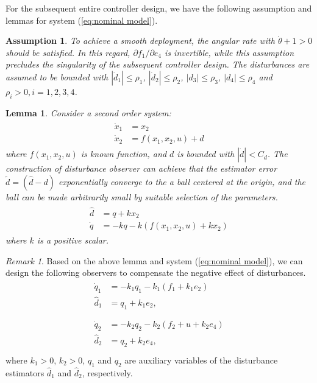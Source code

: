 \documentclass[ShortAfour]{sage}
\theoremstyle{plain}
\newtheorem{myas}{Assumption}
\newtheorem{mylem}{Lemma}
\theoremstyle{remark}
\newtheorem{myrem}{Remark}
\begin{document}
For the subsequent entire controller design, we have the following assumption and lemmas for system (\ref{eq:nominal model}).
\begin{myas}
To achieve a smooth deployment, the angular rate with $\dot\theta+1>0$ should be satisfied. In this regard,  $\partial f_1/\partial e_4$ is invertible, while this assumption precludes the singularity of the subsequent controller design. The disturbances are assumed to be bounded with $\left\vert\dot d_1\right\vert\le \rho_1$, $\left\vert \dot d_2\right\vert\le \rho_2$, $\left\vert d_3\right\vert\le \rho_3$, $\left\vert d_4\right\vert\le \rho_4$ and $\rho_i>0,i = 1,2,3,4$.
\end{myas}
\begin{mylem}\cite{Do2010}
  Consider a second order system:
  \begin{align}\begin{split}
    \dot x_1 &= x_2\\
    \dot x_2 &= f(x_1,x_2,u)+d
  \end{split}\end{align}
where $f(x_1,x_2,u)$ is known function, and $d$ is bounded with $\left\vert\dot d\right\vert<C_d$. The construction of disturbance observer can achieve that the estimator error $\tilde d = (\hat d-d)$ exponentially converge to the a ball centered at the origin, and the ball can be made arbitrarily small by suitable selection of the parameters.
\begin{align}\begin{split}
  \hat d &= q+kx_2\\
  \dot q &= -kq-k(f(x_1,x_2,u)+kx_2)
\end{split}\end{align}
where $k$ is a positive scalar.
\end{mylem}
\begin{myrem}
  Based on the above lemma and system (\ref{eq:nominal model}), we can design the following observers to compensate the negative effect of disturbances.
  \begin{align}\begin{split}
    \dot q_1 &= -k_1q_1-k_1(f_1+k_1e_2)\\
    \hat d_1 &= q_1+k_1e_2\label{eq:do1},\\
  \end{split}\\
  \begin{split}
      \dot q_2 &= -k_2q_2-k_2(f_2+u+k_2e_4)\\
      \hat d_2 &= q_2+k_2e_4\label{eq:do2},\\
  \end{split}\end{align}
  where $k_1>0$, $k_2>0$, $q_1$ and $q_2$ are auxiliary variables of the disturbance estimators $\hat d_1$ and $\hat d_2$, respectively.
\end{myrem}
\end{document}
